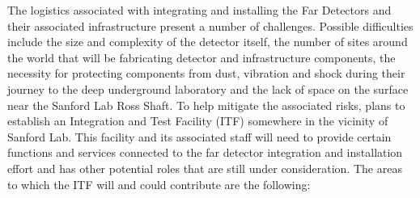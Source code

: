 The logistics associated with integrating and installing the  
Far Detectors and their associated infrastructure present a number of
challenges. Possible difficulties include the size and complexity of 
the detector itself, the number of sites around the world that will be
fabricating detector and infrastructure components, the necessity for
protecting components from dust, vibration and shock during their
journey to the deep underground laboratory and the lack of space on the 
surface near the Sanford Lab Ross Shaft. To help mitigate the associated 
risks,  plans to establish an Integration and Test Facility 
(ITF) somewhere in the vicinity of Sanford Lab. This facility and its 
associated staff will need to provide certain functions and services  
connected to the  far detector integration and installation 
effort and has other potential roles that are still under consideration.
The areas to which the ITF will and could contribute are the following:     
